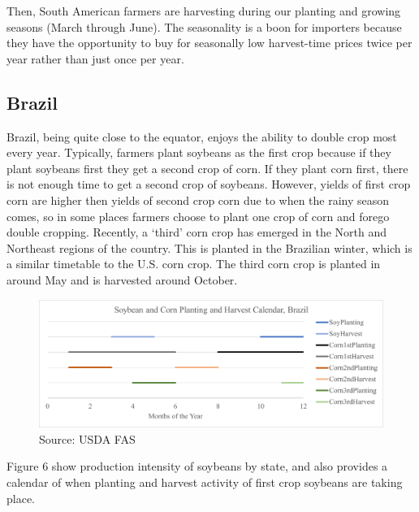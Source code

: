 \documentclass[
  letterpaper,
  DIV=11,
  numbers=noendperiod]{scrreprt}
\begin{document}
Then, South American farmers are harvesting during our planting and
growing seasons (March through June). The seasonality is a boon for
importers because they have the opportunity to buy for seasonally low
harvest-time prices twice per year rather than just once per year.

\subsection{Brazil}\label{brazil}

Brazil, being quite close to the equator, enjoys the ability to double
crop most every year. Typically, farmers plant soybeans as the first
crop because if they plant soybeans first they get a second crop of
corn. If they plant corn first, there is not enough time to get a second
crop of soybeans. However, yields of first crop corn are higher then
yields of second crop corn due to when the rainy season comes, so in
some places farmers choose to plant one crop of corn and forego double
cropping. Recently, a `third' corn crop has emerged in the North and
Northeast regions of the country. This is planted in the Brazilian
winter, which is a similar timetable to the U.S. corn crop. The third
corn crop is planted in around May and is harvested around October.

\begin{figure}[H]

{\centering \includegraphics{assets/Brazilcalendar.png}

}

\caption{Source: USDA FAS}

\end{figure}%

Figure 6 show production intensity of soybeans by state, and also
provides a calendar of when planting and harvest activity of first crop
soybeans are taking place.
\end{document}
